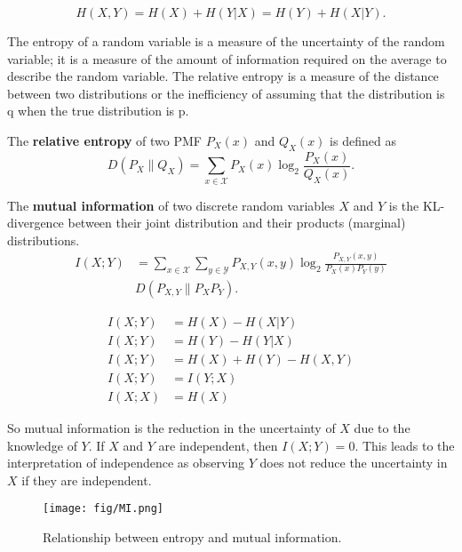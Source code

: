 \begin{theorem}
    \label{thm:chainruleentropy}
    \[H(X,Y)=H(X)+H(Y|X)=H(Y)+H(X|Y).\]
\end{theorem}

The entropy of a random variable is a measure of the uncertainty of the
random variable; it is a measure of the amount of information required on
the average to describe the random variable. The relative entropy is a measure of the distance between two distributions or the inefficiency of assuming
that the distribution is q when the true distribution is p.

\begin{definition}
    The \textbf{relative entropy} of two \textnormal{PMF} $P_X(x)$ and $Q_X(x)$ is defined as
    \[D(P_X\|Q_X)=\sum_{x\in\mathcal{X}}P_X(x)\log_2\frac{P_X(x)}{Q_X(x)}.\]
\end{definition}

\begin{definition}
    The \textbf{mutual information} of two discrete random variables $X$ and $Y$ is the KL-divergence between their joint distribution and their products (marginal) distributions.
    \begin{align*}
        I(X;Y)
        &= \sum_{x\in\mathcal{X}}\sum_{y\in\mathcal{Y}}P_{X,Y}(x,y)\log_2\frac{P_{X,Y}(x,y)}{P_X(x)P_Y(y)}\\
        &D(P_{X,Y}\|P_X P_Y).
    \end{align*}
\end{definition}

\begin{theorem} 
    \begin{align*}
        I(X;Y) &= H(X)-H(X|Y)\\
        I(X;Y) &= H(Y)-H(Y|X)\\
        I(X;Y) &= H(X)+H(Y)-H(X,Y)\\
        I(X;Y) &= I(Y;X)\\
        I(X;X) &= H(X)
    \end{align*}
\end{theorem}

So mutual information is the reduction in the uncertainty of $X$ due to the knowledge of $Y$. If $X$ and $Y$ are independent, then $I(X;Y)=0$. This leads to the interpretation of independence as observing $Y$ does not reduce the uncertainty in $X$ if they are independent.

\begin{figure}[H]
    \centering
    \texttt{[image: fig/MI.png]}
    \caption{Relationship between entropy and mutual information.}
\end{figure}